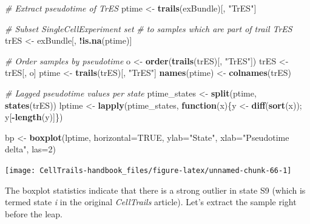 \documentclass[]{book}
\newenvironment{Shaded}{\begin{snugshade}}{\end{snugshade}}
\newcommand{\KeywordTok}[1]{\textcolor[rgb]{0.13,0.29,0.53}{\textbf{#1}}}
\newcommand{\DataTypeTok}[1]{\textcolor[rgb]{0.13,0.29,0.53}{#1}}
\newcommand{\DecValTok}[1]{\textcolor[rgb]{0.00,0.00,0.81}{#1}}
\newcommand{\StringTok}[1]{\textcolor[rgb]{0.31,0.60,0.02}{#1}}
\newcommand{\CommentTok}[1]{\textcolor[rgb]{0.56,0.35,0.01}{\textit{#1}}}
\newcommand{\OtherTok}[1]{\textcolor[rgb]{0.56,0.35,0.01}{#1}}
\newcommand{\ControlFlowTok}[1]{\textcolor[rgb]{0.13,0.29,0.53}{\textbf{#1}}}
\newcommand{\OperatorTok}[1]{\textcolor[rgb]{0.81,0.36,0.00}{\textbf{#1}}}
\newcommand{\NormalTok}[1]{#1}
\theoremstyle{definition}
\theoremstyle{definition}
\theoremstyle{definition}
\theoremstyle{remark}
\begin{document}
\begin{Shaded}
\begin{Highlighting}[]
\CommentTok{# Extract pseudotime of TrES}
\NormalTok{ptime <-}\StringTok{ }\KeywordTok{trails}\NormalTok{(exBundle)[, }\StringTok{"TrES"}\NormalTok{]}

\CommentTok{# Subset SingleCellExperiment set}
\CommentTok{# to samples which are part of trail TrES}
\NormalTok{trES <-}\StringTok{ }\NormalTok{exBundle[, }\OperatorTok{!}\KeywordTok{is.na}\NormalTok{(ptime)]}

\CommentTok{# Order samples by pseudotime}
\NormalTok{o <-}\StringTok{ }\KeywordTok{order}\NormalTok{(}\KeywordTok{trails}\NormalTok{(trES)[, }\StringTok{"TrES"}\NormalTok{])}
\NormalTok{trES <-}\StringTok{ }\NormalTok{trES[, o]}
\NormalTok{ptime <-}\StringTok{ }\KeywordTok{trails}\NormalTok{(trES)[, }\StringTok{"TrES"}\NormalTok{]}
\KeywordTok{names}\NormalTok{(ptime) <-}\StringTok{ }\KeywordTok{colnames}\NormalTok{(trES)}

\CommentTok{# Lagged pseudotime values per state}
\NormalTok{ptime_states <-}\StringTok{ }\KeywordTok{split}\NormalTok{(ptime, }\KeywordTok{states}\NormalTok{(trES))}
\NormalTok{lptime <-}\StringTok{ }\KeywordTok{lapply}\NormalTok{(ptime_states, }
                 \ControlFlowTok{function}\NormalTok{(x)\{y <-}\StringTok{ }\KeywordTok{diff}\NormalTok{(}\KeywordTok{sort}\NormalTok{(x)); y[}\OperatorTok{-}\KeywordTok{length}\NormalTok{(y)]\})}

\NormalTok{bp <-}\StringTok{ }\KeywordTok{boxplot}\NormalTok{(lptime, }\DataTypeTok{horizontal=}\OtherTok{TRUE}\NormalTok{, }
              \DataTypeTok{ylab=}\StringTok{"State"}\NormalTok{, }\DataTypeTok{xlab=}\StringTok{"Pseudotime delta"}\NormalTok{, }\DataTypeTok{las=}\DecValTok{2}\NormalTok{)}
\end{Highlighting}
\end{Shaded}

\texttt{[image: CellTrails-handbook\_files/figure-latex/unnamed-chunk-66-1]}

The boxplot statistics indicate that there is a strong outlier in state
S9 (which is termed state \emph{i} in the original \emph{CellTrails}
article). Let's extract the sample right before the leap.

\begin{Shaded}
\end{Shaded}
\end{document}
